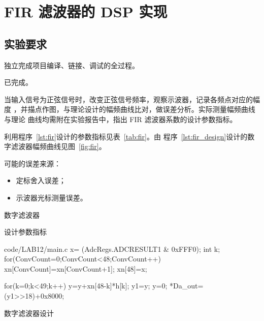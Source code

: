 \documentclass[../main]{subfiles}
\begin{document}
\chapter{FIR 滤波器的 DSP 实现}%
\label{cha:fir}

\section{实验要求}%
\label{sec:\arabic{chapter}requirement}

\begin{Exercise}
  独立完成项目编译、链接、调试的全过程。
\end{Exercise}

\begin{Answer}
  已完成。
\end{Answer}

\begin{Exercise}
  当输入信号为正弦信号时，改变正弦信号频率，观察示波器，记录各频点对应的幅度
  ，并描点作图，与理论设计的幅频曲线比对，做误差分析。实际测量幅频曲线与理论
  曲线均需附在实验报告中，指出 FIR 滤波器系数的设计参数指标。
\end{Exercise}

\begin{Answer}
  利用程序~\ref{lst:fir}设计的参数指标见表~\ref{tab:fir}。由
  程序~\ref{lst:fir_design}设计的数字滤波器幅频曲线见图~\ref{fig:fir}。

  可能的误差来源：

  \begin{itemize}
    \item 定标舍入误差；
    \item 示波器光标测量误差。
  \end{itemize}
\end{Answer}

\begin{listing}[htbp]
  \centering
  \caption{数字滤波器}%
  \label{lst:fir}
\end{listing}

\begin{table}[htbp]
  \centering
  \caption{设计参数指标}%
  \label{tab:fir}
  \tiny
\end{table}

\begin{listing}[htbp]
  \centering
\begin{langPyOne}[matlab][firstnumber = 366]{code/LAB12/main.c}
   x= (AdcRegs.ADCRESULT1 & 0xFFF0);
	 int k;
	 for(ConvCount=0;ConvCount<48;ConvCount++)
      xn[ConvCount]=xn[ConvCount+1];
	 xn[48]=x;

	 for(k=0;k<49;k++)
      y=y+xn[48-k]*h[k];
	 y1=y;
	 y=0;
	 *Da_out=(y1>>18)+0x8000;
\end{langPyOne}
  \caption{数字滤波器设计}%
  \label{lst:fir_design}
\end{listing}
\end{document}
